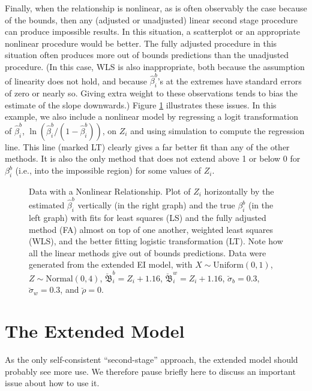 \documentclass[11pt,titlepage]{article}
\newcommand{\bbeta}{{\mathfrak B}}
\newcommand{\sigmau}{\breve{\sigma}}
\newcommand{\rhou}{\breve{\rho}}
\begin{document}
Finally, when the relationship is nonlinear, as is often observably
the case because of the bounds, then any (adjusted or unadjusted)
linear second stage procedure can produce impossible results.  In this
situation, a scatterplot or an appropriate nonlinear procedure would
be better.  The fully adjusted procedure in this situation often
produces more out of bounds predictions than the unadjusted procedure.
(In this case, WLS is also inappropriate, both because the assumption
of linearity does not hold, and because $\hat\beta_i^b$'s at the
extremes have standard errors of zero or nearly so.  Giving extra
weight to these observations tends to bias the estimate of the slope
downwards.)  Figure \ref{f:nonlinear} illustrates these issues.  In
this example, we also include a nonlinear model by regressing a logit
transformation of $\hat\beta_i^b$,
$\ln(\hat\beta_i^b/(1-\hat\beta_i^b))$, on $Z_i$ and using simulation
to compute the regression line.  This line (marked LT) clearly gives a
far better fit than any of the other methods.  It is also the only
method that does not extend above 1 or below 0 for $\beta_i^b$ (i.e.,
into the impossible region) for some values of $Z_i$.
\begin{figure}[t]
  \begin{center}
    \caption{Data with a Nonlinear Relationship.  Plot of $Z_i$ 
      horizontally by the estimated $\hat\beta_i^b$ vertically (in the
      right graph) and the true $\beta_i^b$ (in the left graph) with
      fits for least squares (LS) and the fully adjusted method (FA)
      almost on top of one another, weighted least squares (WLS), and
      the better fitting logistic transformation (LT).  Note how all
      the linear methods give out of bounds predictions.  Data were
      generated from the extended EI model, with $X \sim
      \textrm{Uniform}(0,1)$, $Z \sim \textrm{Normal}(0,4)$,
      $\breve\bbeta_i^b = Z_i + 1.16$, $\breve\bbeta_i^w = Z_i +
      1.16$, $\sigmau_b = 0.3$, $\sigmau_w = 0.3$, and $\rhou = 0$.}
    \label{f:nonlinear}
  \end{center}
\end{figure}

\section{The Extended Model} \label{s:exten}

As the only self-consistent ``second-stage'' approach, the extended
model should probably see more use.  We therefore pause briefly here
to discuss an important issue about how to use it.  
\end{document}
